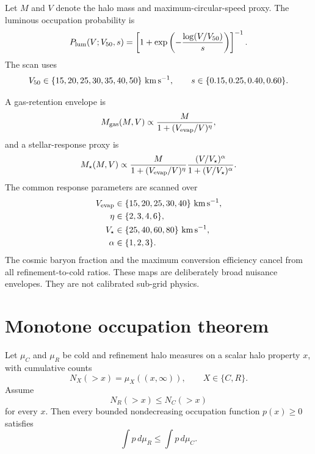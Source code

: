 Let $M$ and $V$ denote the halo mass and maximum-circular-speed proxy.  The luminous occupation probability is
\begin{equation}
P_{\rm lum}(V;V_{50},s)
=
\left[1+\exp\left(-\frac{\log(V/V_{50})}{s}\right)\right]^{-1}.
\label{eq:brf-occupation}
\end{equation}
The scan uses
\begin{equation}
V_{50}\in\{15,20,25,30,35,40,50\}\ {\rm km\,s^{-1}},
\qquad
s\in\{0.15,0.25,0.40,0.60\}.
\label{eq:brf-occupation-grid}
\end{equation}

A gas-retention envelope is
\begin{equation}
M_{\rm gas}(M,V)
\propto
\frac{M}{1+(V_{\rm evap}/V)^\eta},
\label{eq:brf-gas-response}
\end{equation}
and a stellar-response proxy is
\begin{equation}
M_\star(M,V)
\propto
\frac{M}{1+(V_{\rm evap}/V)^\eta}
\frac{(V/V_\star)^\alpha}{1+(V/V_\star)^\alpha}.
\label{eq:brf-stellar-response}
\end{equation}
The common response parameters are scanned over
\begin{equation}
\begin{aligned}
V_{\rm evap}&\in\{15,20,25,30,40\}\ {\rm km\,s^{-1}},\\
\eta&\in\{2,3,4,6\},\\
V_\star&\in\{25,40,60,80\}\ {\rm km\,s^{-1}},\\
\alpha&\in\{1,2,3\}.
\end{aligned}
\label{eq:brf-response-grid}
\end{equation}
The cosmic baryon fraction and the maximum conversion efficiency cancel from all refinement-to-cold ratios.  These maps are deliberately broad nuisance envelopes.  They are not calibrated sub-grid physics.

\section{Monotone occupation theorem}

\begin{theorem}
Let $\mu_C$ and $\mu_R$ be cold and refinement halo measures on a scalar halo property $x$, with cumulative counts
\[
N_X(>x)=\mu_X((x,\infty)),\qquad X\in\{C,R\}.
\]
Assume
\[
N_R(>x)\le N_C(>x)
\]
for every $x$.  Then every bounded nondecreasing occupation function $p(x)\ge0$ satisfies
\begin{equation}
\int p\,d\mu_R\le\int p\,d\mu_C.
\label{eq:brf-monotone-ordering}
\end{equation}
\end{theorem}

